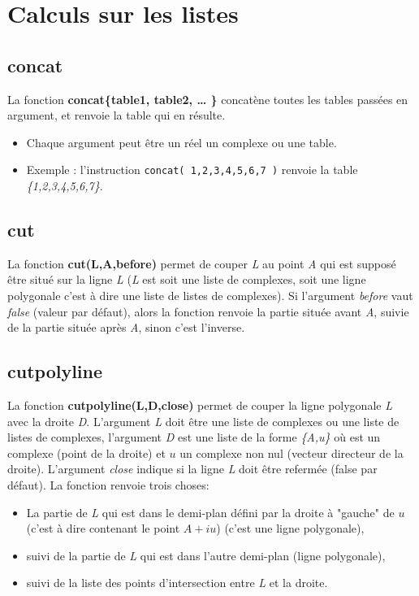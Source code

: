 \section{Calculs sur les listes}

\subsection{concat}
La fonction \textbf{concat\{table1, table2, \ldots{} \}} concatène toutes les tables passées en argument, et renvoie la table qui en résulte.

\begin{itemize}
 \item Chaque argument peut être un réel un complexe ou une table.
\item Exemple : l'instruction \texttt{concat( 1,2,3,{4,5,6},7 )} renvoie la table \emph{\{1,2,3,4,5,6,7\}}.
\end{itemize}

\subsection{cut}
La fonction \textbf{cut(L,A,before)} permet de couper \emph{L} au point \emph{A} qui est supposé être situé sur la ligne \emph{L} (\emph{L} est soit une liste de complexes, soit une ligne polygonale c'est à dire une liste de listes de complexes). Si l'argument \emph{before} vaut \emph{false} (valeur par défaut), alors la fonction renvoie la partie située avant \emph{A}, suivie de la partie située après \emph{A}, sinon c'est l'inverse.

\subsection{cutpolyline}
La fonction \textbf{cutpolyline(L,D,close)} permet de couper la ligne polygonale \emph{L} avec la droite \emph{D}. L'argument \emph{L} doit être une liste de complexes ou une liste de listes de complexes, l'argument \emph{D} est une liste de la forme \emph{\{A,u\}} où est un complexe (point de la droite) et $u$ un complexe non nul (vecteur directeur de la droite). L'argument \emph{close} indique si la ligne \emph{L} doit être refermée (false par défaut). La fonction renvoie trois choses:
\begin{itemize}
    \item La partie de \emph{L} qui est dans le demi-plan défini par la droite à "gauche" de $u$ (c'est à dire contenant le point $A+iu$) (c'est une ligne polygonale),
    \item suivi de la partie de \emph{L} qui est dans l'autre demi-plan (ligne polygonale),
    \item suivi de la liste des points d'intersection entre \emph{L} et la droite.
\end{itemize}

